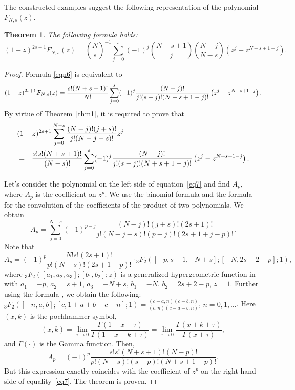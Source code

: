 \documentclass[12pt]{article}
\newtheorem{thm}{Theorem}[section]
\newcommand{\pa}[1]{\left(#1\right)}
\newcommand{\br}[1]{\left[#1\right]}
\newcommand{\prescript}[3]{\phantom{}_{#1}{#2}_{#3}}
\begin{document}
The constructed examples suggest the following representation of the polynomial $F_{N,s}(z)$.

\begin{thm}\label{thm3}
The following formula holds:
\begin{equation}\label{eqn6}
(1 - z)^{2s + 1}F_{N,s}(z) = {N\choose s}^{-1} \sum_{j = 0}^{s}(-1)^j {N+s+1\choose j}{N-j\choose N-s}\pa{z^j - z^{N + s + 1 - j}}.
\end{equation}
\end{thm}

\begin{proof} Formula \eqref{eqn6} is equivalent to
\begin{equation}\notag
(1 - z)^{2s + 1}F_{N,s}(z) = \frac{s!(N + s + 1)!}{N!}\sum_{j = 0}^{s}(-1)^j \frac{(N - j)!}{j!(s - j)!(N + s + 1- j)!}\pa{z^j - z^{N + s + 1 - j}}.
\end{equation}
By virtue of Theorem~\ref{thm1}, it is required to prove that
\begin{eqnarray}\label{eq7}
\lefteqn{(1 - z)^{2s + 1}\sum_{j = 0}^{N - s}\frac{(N - j)!(j + s)!}{j!(N - j - s)!}z^j} \nonumber \\&=& \frac{s!s!(N + s + 1)!}{(N - s)!}\sum_{j = 0}^{s}(-1)^j \frac{(N - j)!}{j!(s - j)!(N + s + 1- j)!}\pa{z^j - z^{N + s + 1 - j}}.
\end{eqnarray}

Let's consider the polynomial on the left side of equation~\eqref{eq7} and find $A_p$, where $A_p$ is the coefficient on $z^p$. We use the binomial formula and the formula for the convolution of the coefficients of the product of two polynomials. We obtain
\begin{displaymath}
A_p = \sum_{j = 0}^{N - s}(-1)^{p - j}\frac{(N - j)!(j + s)!(2s + 1)!}{j!(N - j - s)!(p - j)!(2s + 1 + j - p)!}.
\end{displaymath}
Note that
\begin{displaymath}
A_p =(-1)^p\frac{N!s!(2s + 1)!}{p!(N - s)!(2s + 1- p)!} \cdot \prescript{3}{F}{2}\pa{\br{-p,s + 1,-N + s};\br{-N,2s + 2 - p};1},
\end{displaymath}
 where
$\displaystyle\prescript{3}{F}{2}\pa{\br{a_1,a_2,a_3};\br{b_1,b_2};z}$
is a generalized hypergeometric function in \cite{ref14} with $a_1 = -p$, $a_2 = s + 1$, $a_3 = -N + s$, $b_1 = -N$, $b_2 = 2s + 2 - p$, $z = 1$. Further using the formula \cite[5.2.4,(1)]{ref14}, we obtain  the following:
$\displaystyle\prescript{3}{F}{2}\pa{\br{-n,a,b};\br{c,1 + a + b - c - n}; 1} = \frac{(c - a,n)(c - b,n)}{(c,n)(c - a - b,n)}$, $n = 0,1, \ldots$.
Here $(x,k)$ is the pochhammer symbol, 
$$(x,k) = \lim_{\tau \rightarrow 0} \frac{\Gamma(1 - x + \tau)}{\Gamma(1 - x - k + \tau)}=
\lim_{\tau \rightarrow 0} \frac{\Gamma(x +  k + \tau)}{\Gamma(x + \tau)},$$ 
and $\Gamma(\cdot)$ is the Gamma function. Then,
\begin{displaymath}
A_p = (-1)^p \frac{s!s!(N + s + 1)!(N - p)!}{p!(N - s)!(s - p)!(N + s + 1 - p)!}.
\end{displaymath}
But this expression exactly coincides with the coefficient of $z^p$ on the right-hand side of equality~\eqref{eq7}. The theorem is proven.
\end{proof}
\end{document}
